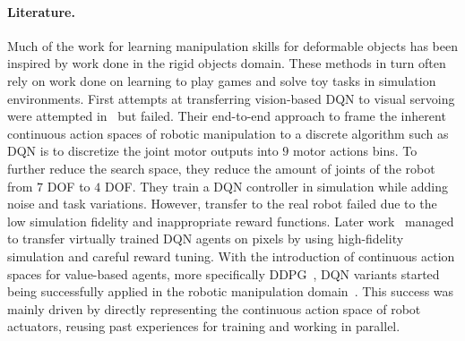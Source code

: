 \documentclass[\home/main.tex]{subfiles}
\begin{document}
\paragraph{Literature.}
Much of the work for learning manipulation skills for deformable objects has been inspired by work done in the rigid objects domain. These methods in turn often rely on work done on learning to play games and solve toy tasks in simulation environments.  First attempts at transferring vision-based DQN to visual servoing were attempted in~\autocite{Zhang2015} but failed. Their end-to-end approach to frame the inherent continuous action spaces of robotic manipulation to a discrete algorithm such as DQN is to discretize the joint motor outputs into $9$ motor actions bins. To further reduce the search space, they reduce the amount of joints of the robot from $7$ DOF to $4$ DOF. They train a DQN controller in simulation while adding noise and task variations. However, transfer to the real robot failed due to the low simulation fidelity and inappropriate reward functions. Later work~\autocite{James2016} managed to transfer virtually trained DQN agents on pixels by using high-fidelity simulation and careful reward tuning. With the introduction of continuous action spaces for value-based agents, more specifically DDPG~\autocite{Lillicrap2015}, DQN variants started being successfully applied in the robotic manipulation domain~\autocite{Gu2017}. This success was mainly driven by directly representing the continuous action space of robot actuators, reusing past experiences for training and working in parallel.
\end{document}
